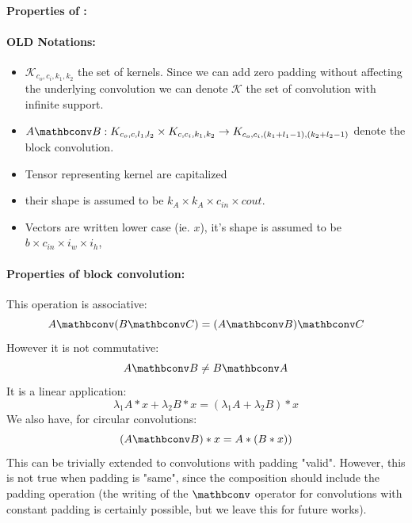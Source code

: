 
\paragraph{Properties of \Bconv{}:}


    
    \paragraph{OLD Notations:}
    \begin{itemize}
        \item $\mathcal{K}_{c_o,c_i,k_1,k_2}$ the set of kernels. Since we can add zero padding without affecting the underlying convolution we can denote $\mathcal{K}$ the set of convolution with infinite support. 
        \item $A \mathbconv B: {K}_{c_o,c,l_1,l_2} \times {K}_{c,c_i,k_1,k_2} \rightarrow {K}_{c_o,c_i,(k_1+l_1-1),(k_2+l_2-1)}$ denote the block convolution.
        \item  Tensor representing kernel are capitalized
        \item their shape is assumed to be $k_A \times k_A \times c_{in} \times c{out}$. 
        \item Vectors are written lower case (ie. $x$), it's shape is assumed to be $ b \times c_{in} \times i_w \times i_h $, 
    \end{itemize}

    \paragraph{Properties of block convolution:}This operation is associative: 
    \[ A \mathbconv (B \mathbconv C) = (A \mathbconv B ) \mathbconv C \]
    However it is not commutative:
    \[ A \mathbconv B \neq B \mathbconv A \]
    It is a linear application:
    \[ \lambda_1 A * x + \lambda_2 B * x = (\lambda_1 A + \lambda_2 B) * x \]
    We also have, for circular convolutions:
    \[ (A \mathbconv B) * x = A * ( B * x))  \]
    This can be trivially extended to convolutions with padding "valid". However, this is not true when padding is "same", since the composition should include the padding operation (the writing of the $\mathbconv$ operator for convolutions with constant padding is certainly possible, but we leave this for future works). %


